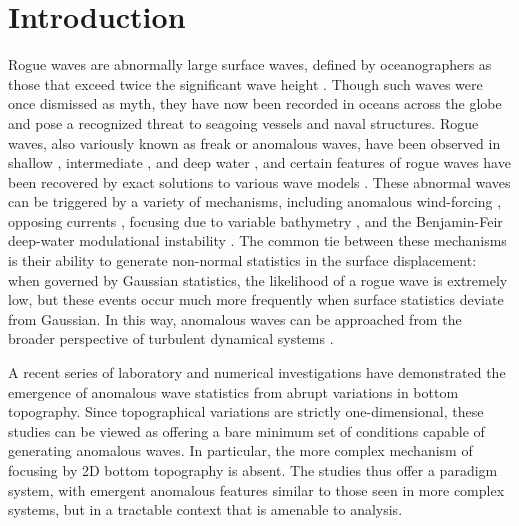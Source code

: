 \documentclass[11pt]{article}
\newcommand{\new}[1]{{ #1}}
\begin{document}
\section{Introduction}

Rogue waves are abnormally large surface waves, defined by oceanographers as those that exceed twice the significant wave height \cite{muller2005rogue, ying2011linear}. Though such waves were once dismissed as myth, they have now been recorded in oceans across the globe and pose a recognized threat to seagoing vessels and naval structures. Rogue waves, also variously known as freak or anomalous waves, have been observed in shallow \cite{pelinovsky2000nonlinear, gramstad2013freak}, intermediate \cite{karmpadakis2019laboratory}, and deep water \cite{dematteis2018rogue, dematteis2019experimental}, \new{ and certain features of rogue waves have been recovered by exact solutions to various wave models \cite{peregrine1983water, clarkson2017rational, chen2019periodic}}.
These abnormal waves can be triggered by a variety of mechanisms, including anomalous wind-forcing \cite{kharif2008influence, toffoli2017wind}, opposing currents \cite{garrett2009rogue, onorato2011triggering}, focusing due to variable bathymetry \cite{heller2008refraction, white1998chance}, 
and the Benjamin-Feir deep-water modulational instability \cite{benjamin1967disintegration, viotti2013emergence, cousins2015unsteady, farazmand2017reduced}.
The common tie between these mechanisms is their ability to generate non-normal statistics in the surface displacement: when governed by Gaussian statistics, the likelihood of a rogue wave is extremely low, but these events occur much more frequently when surface statistics deviate from Gaussian. In this way, anomalous waves can be approached from the broader perspective of turbulent dynamical systems \cite{sapsis2013a, sapsis2013b, sapsis2013blending, chen2016filtering, majda2016introduction, macedo2017universality, MajdaQiSIAM2018, blonigan2019extreme, guth2019machine, holm2019stochastic}.


A recent series of laboratory \cite{bolles2019, trulsen2020extreme} and numerical investigations \cite{viotti2014, herterich2019extreme} have demonstrated the emergence of anomalous wave statistics from abrupt variations in bottom topography. Since topographical variations are strictly one-dimensional, these studies can be viewed as offering a bare minimum set of conditions capable of generating anomalous waves. In particular, the more complex mechanism of focusing by 2D bottom topography is  absent. The studies thus offer a paradigm system, with emergent anomalous features similar to those seen in more complex systems, but in a tractable context that is amenable to analysis.
\end{document}
